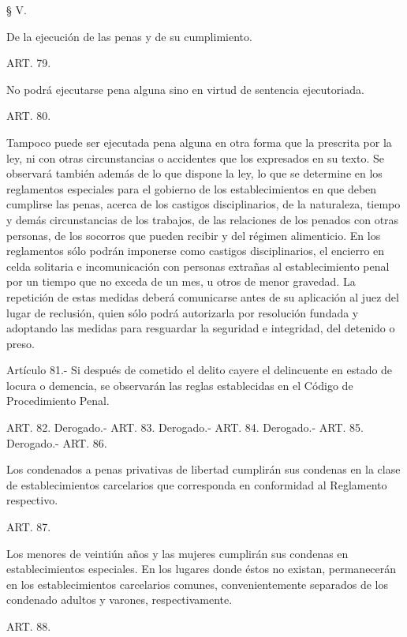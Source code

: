     § V.
   
    De la ejecución de las penas y de su cumplimiento.


    ART. 79.

    No podrá ejecutarse pena alguna sino en virtud de sentencia ejecutoriada.


    ART. 80.

    Tampoco puede ser ejecutada pena alguna en otra forma que la prescrita por la ley, ni con otras circunstancias o accidentes que los expresados en su texto.
    Se observará también además de lo que dispone la ley, lo que se determine en los reglamentos especiales para el gobierno de los establecimientos en que deben cumplirse las penas, acerca de los castigos disciplinarios, de la naturaleza, tiempo y demás circunstancias de los trabajos, de las relaciones de los penados con otras personas, de los socorros que pueden recibir y del régimen alimenticio.
    En los reglamentos sólo podrán imponerse como castigos disciplinarios, el encierro en celda solitaria e incomunicación con personas extrañas al establecimiento penal por un tiempo que no exceda de un mes, u otros de menor gravedad.
    La repetición de estas medidas deberá comunicarse antes de su aplicación al juez del lugar de reclusión, quien sólo podrá autorizarla por resolución fundada y adoptando las medidas para resguardar la seguridad e integridad, del detenido o preso.






    Artículo 81.- Si después de cometido el delito cayere el delincuente en estado de locura o demencia, se observarán las reglas establecidas en el Código de Procedimiento Penal.



    ART. 82. Derogado.-
    ART. 83. Derogado.-
    ART. 84. Derogado.-
    ART. 85. Derogado.-
    ART. 86.

    Los condenados a penas privativas de libertad cumplirán sus condenas en la clase de establecimientos carcelarios que corresponda en conformidad al Reglamento respectivo.

    ART. 87.

    Los menores de veintiún años y las mujeres cumplirán sus condenas en establecimientos especiales. En los lugares donde éstos no existan, permanecerán en los establecimientos carcelarios comunes, convenientemente separados de los condenado adultos y varones, respectivamente.



    ART. 88.

